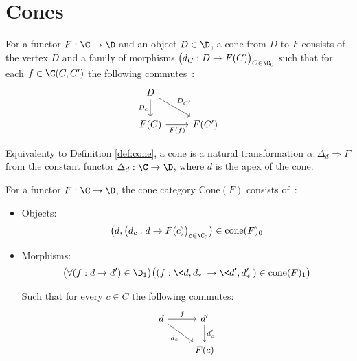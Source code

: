 \section{Cones}

\begin{definition}\label{def:cone}

  For a functor $F:\C\to \D$ and an object $D\in \D$, a cone from $D$ to $F$
	consists of the vertex $D$ and a family of morphisms $\big(d_C: D \to
	F(C)\big)_{C\in \C_0}$ such that for each $f\in \C(C, C')$ the following
	commutes~\parencite[p.~118]{leinster:basic_category_theory}:
	\[\begin{tikzcd}[ampersand replacement=\&]
		D \\
		{F(C)} \& {F(C')}
		\arrow["{D_{C'}}", from=1-1, to=2-2]
		\arrow["{D_c}"', from=1-1, to=2-1]
		\arrow["{F(f)}"', from=2-1, to=2-2]
	\end{tikzcd}\]
\end{definition}

\begin{definition}
	Equivalenty to Definition \ref{def:cone}, a cone is a natural transformation
	$\alpha: \Delta_d \Rightarrow F$ from the constant functor $\Delta_d:\C\to
	\D$, where $d$ is the apex of the cone.
\end{definition}

\begin{definition}
  For a functor $F:\C\to \D$, the cone category $\mathrm{Cone}(F)$ consists
  of~\parencite[p.~75]{riehl:category_theory_in_context}:
  \begin{itemize}
    \item Objects:
      \[\big(d, \big(d_c: d \to F(c)\big)_{c\in \C_0}\big)\in
        \mathrm{cone}(F)_0\]
    \item Morphisms:
      \[\big(\forall (f : d \to d') \in \D_1\big)
        \big((f: \<d, d_*\>\to \<d', d'_*\>) \in \mathrm{cone}(F)_1\big)\]

      Such that for every $c\in C$ the following commutes:
      \[\begin{tikzcd}
        d & {d'} \\
        & {F(c)}
        \arrow["{d_c}"', from=1-1, to=2-2]
        \arrow["{d'_c}", from=1-2, to=2-2]
        \arrow["f", from=1-1, to=1-2]
      \end{tikzcd}\]
  \end{itemize}
\end{definition}